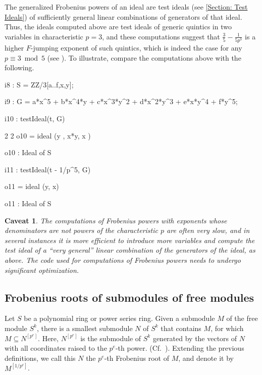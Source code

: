 \documentclass{amsart}
\newtheorem*{caveat}{Caveat}
\begin{document}
The generalized Frobenius powers of an ideal are test ideals (see \autoref{Section: Test Ideals}) of sufficiently general linear combinations of generators of that ideal.
Thus, the ideals computed above are test ideals of generic quintics in two variables in characteristic $p=3$, and these computations suggest that $\frac35-\frac1{5p^3}$ is a higher $F$-jumping exponent of such quintics, which is indeed the case for any $p\equiv 3 \bmod 5$ (see \cite{hernandez+etal.frobenius_examples}).
To illustrate, compare the computations above with the following.

\medskip
{\small{}
\begin{MyVerbatim}
i8 : S = ZZ/3[a..f,x,y];

i9 : G = a*x^5 + b*x^4*y + c*x^3*y^2 + d*x^2*y^3 + e*x*y^4 + f*y^5;

i10 : testIdeal(t, G)

              2        2
o10 = ideal (y , x*y, x )

o10 : Ideal of S

i11 : testIdeal(t - 1/p^5, G)

o11 = ideal (y, x)

o11 : Ideal of S
\end{MyVerbatim}
}
\medskip

\begin{caveat}
   The computations of Frobenius powers with exponents whose denominators are not powers of the characteristic $p$ are often very slow, and in several instances it is more efficient to introduce more variables and compute the test ideal of a ``very general'' linear combination of the generators of the ideal, as above.
   The code used for computations of Frobenius powers needs to undergo significant optimization.
\end{caveat}

\subsection{Frobenius  roots of submodules of free modules}

Let $S$ be a polynomial ring or power series ring.
Given a submodule $M$ of the free module $S^k$,
%
%
there is a smallest submodule $N$ of $S^k$ that contains $M$, for which $M\subseteq N^{[p^e]}$.
Here,  $N^{[p^e]}$ is the submodule  of $S^k$ generated by the vectors of $N$ with all coordinates raised to the $p^e$-th power. (Cf.~\cite{KatzmanZhangAlgorithm}).
Extending the previous definitions,
we call this $N$ the $p^e$-th Frobenius root of $M$, and denote it by $M^{[1/p^e]}$.
\end{document}
